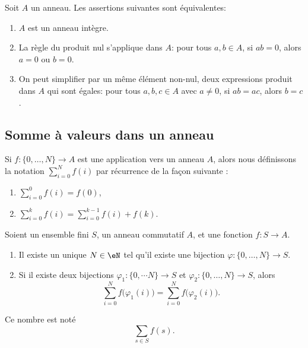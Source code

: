 \begin{proposition}     \label{PROPooZWUEooUHTtUI}
    Soit $A$ un anneau. Les assertions suivantes sont équivalentes:
    \begin{enumerate}
        \item
            $A$ est un anneau intègre.
        \item
            La règle du produit nul s'applique dans $A$: pour tous \( a, b \in A \), si \( ab=0\), alors \( a = 0\) ou \( b = 0\).
        \item       \label{ITEMooQNTFooSRrVPK}
            On peut simplifier par un même élément non-nul, deux expressions produit dans $A$ qui sont égales: pour tous \( a, b, c \in A \) avec \( a \neq 0 \), si \( ab = ac \), alors \( b = c \).
    \end{enumerate}
\end{proposition}

\subsection{Somme à valeurs dans un anneau}

\begin{definition}
    Si \( f\colon \{ 0,\ldots, N \}\to A\) est une application vers un anneau \( A\), alors nous définissons la notation \( \sum_{i=0}^Nf(i)\) par récurrence de la façon suivante :
    \begin{enumerate}
        \item
            \( \sum_{i=0}^0f(i)=f(0)\),
        \item
            \( \sum_{i=0}^{k}f(i)=\sum_{i=0}^{k-1}f(i)+f(k)\).
    \end{enumerate}
\end{definition}

\begin{propositionDef}       \label{DEFooLNEXooYMQjRo}
    Soient un ensemble fini \( S\), un anneau commutatif \( A\), et une fonction \( f\colon S\to A\). 
    \begin{enumerate}
        \item
            Il existe un unique \( N\in \eN\) tel qu'il existe une bijection \( \varphi\colon \{ 0,\ldots, N \}\to S\).
        \item
            Si il existe deux bijections \( \varphi_1\colon \{ 0,\cdots N \}\to S\) et \( \varphi_2\colon \{ 0,\ldots, N \}\to S\), alors
            \begin{equation}
                \sum_{i=0}^Nf\big( \varphi_1(i) \big)=\sum_{i=0}^Nf\big( \varphi_2(i) \big).
            \end{equation}
    \end{enumerate}
    Ce nombre est noté
    \begin{equation}
        \sum_{s\in S}f(s).
    \end{equation}
\end{propositionDef}

